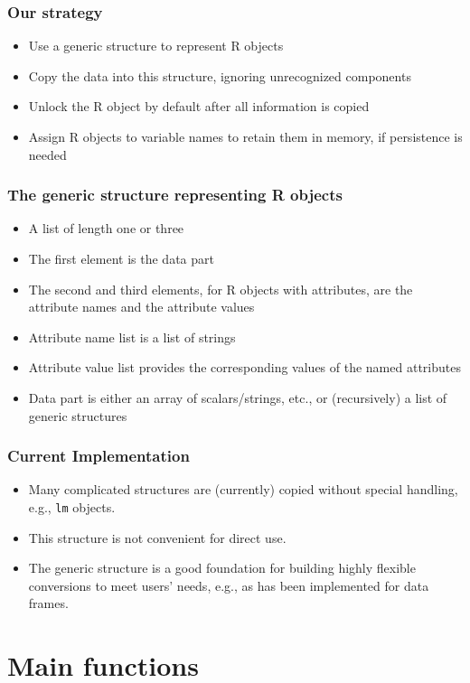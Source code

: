 \documentclass{beamer}
\begin{document}
\begin{frame}
\frametitle{Our strategy}
\begin{itemize}
	\item Use a generic structure to represent R objects
	\item Copy the data into this structure, ignoring unrecognized components
	\item Unlock the R object by default after all information is copied
	\item Assign R objects to variable names to retain them in memory, if persistence is needed
\end{itemize}
\end{frame}

\begin{frame}
\frametitle{The generic structure representing R objects}
\begin{itemize}
	\item A list of length one or three
	\item The first element is the data part
	\item The second and third elements, for R objects with attributes, are the attribute names and the attribute values
	\item Attribute name list is a list of strings
	\item Attribute value list provides the corresponding values of the named attributes
	\item Data part is either an array of scalars/strings, etc., or (recursively) a list of generic structures
\end{itemize}
\end{frame}

\begin{frame}
\frametitle{Current Implementation}
\begin{itemize}
	\item Many complicated structures are (currently) copied without special handling, e.g., \texttt{lm} objects.
	\item This structure is not convenient for direct use.
	\item The generic structure is a good foundation for building highly flexible conversions to meet users' needs, e.g., as has been implemented for data frames.
\end{itemize}
\end{frame}

\section{Main functions}
\end{document}
